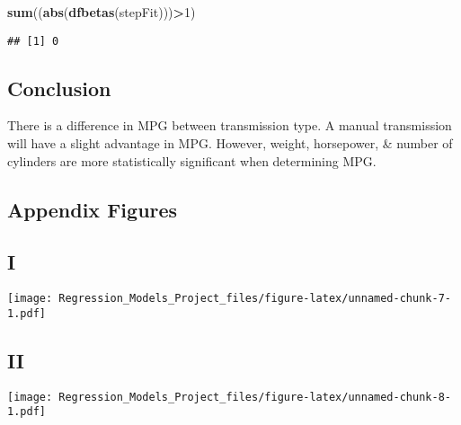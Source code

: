 \documentclass[]{article}
\newenvironment{Shaded}{\begin{snugshade}}{\end{snugshade}}
\newcommand{\KeywordTok}[1]{\textcolor[rgb]{0.13,0.29,0.53}{\textbf{#1}}}
\newcommand{\DecValTok}[1]{\textcolor[rgb]{0.00,0.00,0.81}{#1}}
\newcommand{\OperatorTok}[1]{\textcolor[rgb]{0.81,0.36,0.00}{\textbf{#1}}}
\newcommand{\NormalTok}[1]{#1}
\begin{document}
\begin{Shaded}
\begin{Highlighting}[]
\KeywordTok{sum}\NormalTok{((}\KeywordTok{abs}\NormalTok{(}\KeywordTok{dfbetas}\NormalTok{(stepFit)))}\OperatorTok{>}\DecValTok{1}\NormalTok{)}
\end{Highlighting}
\end{Shaded}

\begin{verbatim}
## [1] 0
\end{verbatim}

\subsection{Conclusion}\label{conclusion}

There is a difference in MPG between transmission type. A manual
transmission will have a slight advantage in MPG. However, weight,
horsepower, \& number of cylinders are more statistically significant
when determining MPG.

\subsection{Appendix Figures}\label{appendix-figures}

\subsection{I}\label{i}

\texttt{[image: Regression\_Models\_Project\_files/figure-latex/unnamed-chunk-7-1.pdf]}

\subsection{II}\label{ii}

\texttt{[image: Regression\_Models\_Project\_files/figure-latex/unnamed-chunk-8-1.pdf]}
\end{document}
